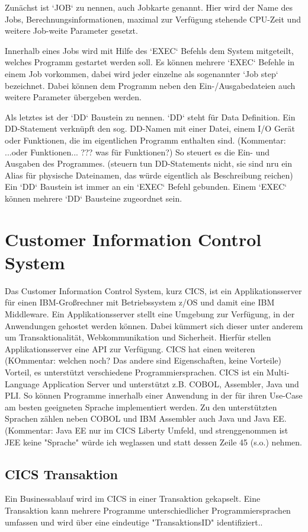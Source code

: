 Zunächst ist `JOB` zu nennen, auch Jobkarte genannt.
Hier wird der Name des Jobs, Berechnungsinformationen, maximal zur Verfügung stehende CPU-Zeit und weitere Job-weite Parameter gesetzt.

Innerhalb eines Jobs wird mit Hilfe des `EXEC` Befehls dem System mitgeteilt, welches Programm gestartet werden soll.
Es können mehrere `EXEC` Befehle in einem Job vorkommen, dabei wird jeder einzelne als sogenannter `Job step` bezeichnet.
Dabei können dem Programm neben den Ein-/Ausgabedateien auch weitere Parameter übergeben werden.

Als letztes ist der `DD` Baustein zu nennen.
`DD` steht für Data Definition.
Ein DD-Statement verknüpft den sog. DD-Namen mit einer Datei, einem I/O Gerät oder Funktionen, die im eigentlichen Programm enthalten sind. (Kommentar: ...oder Funktionen... ??? was für Funktionen?)
So steuert es die Ein- und Ausgaben des Programmes. (steuern tun DD-Statements nicht, sie sind nru ein Alias für physische Dateinamen, das würde eigentlich als Beschreibung reichen)
Ein `DD` Baustein ist immer an ein `EXEC` Befehl gebunden.
Einem `EXEC` können mehrere `DD` Bausteine zugeordnet sein. 
\cite{Ebbers.2011}

\section{Customer Information Control System}\label{cics}
Das Customer Information Control System, kurz CICS, ist ein Applikationsserver für einen IBM-Großrechner mit Betriebssystem z/OS und damit eine IBM Middleware.
Ein Applikationsserver stellt eine Umgebung zur Verfügung, in der Anwendungen gehostet werden können.
Dabei kümmert sich dieser unter anderem um Transaktionalität, Webkommunikation und Sicherheit.
Hierfür stellen Applikationsserver eine API zur Verfügung.
CICS hat einen weiteren (KOmmentar: welchen noch? Das andere sind Eigenschaften, keine Vorteile) Vorteil, es unterstützt verschiedene Programmiersprachen.
CICS ist ein Multi-Language Application Server und unterstützt z.B. COBOL, Assembler, Java und PLI.
So können Programme innerhalb einer Anwendung in der für ihren Use-Case am besten geeigneten Sprache implementiert werden.
Zu den unterstützten Sprachen zählen neben COBOL und IBM Assembler auch Java und Java EE. (Kommentar: Java EE nur im CICS Liberty Umfeld, und strenggenommen ist JEE keine "Sprache" würde ich weglassen und statt dessen Zeile 45 (s.o.) nehmen.
\cite{Rayns.2011}

\subsection{CICS Transaktion}\label{subsec:trans}
Ein Businessablauf wird im CICS in einer Transaktion gekapselt.
Eine Transaktion kann mehrere Programme unterschiedlicher Programmiersprachen umfassen und wird über eine eindeutige "TransaktionsID" identifiziert..

